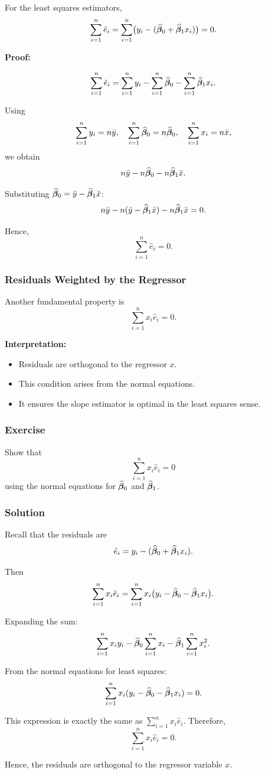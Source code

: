 For the least squares estimators,
\[
\sum_{i=1}^n \hat{e}_i
=
\sum_{i=1}^n \bigl(y_i - (\widehat{\boldsymbol{\beta}}_0 + \widehat{\boldsymbol{\beta}}_1 x_i)\bigr)
=
0.
\]

\textbf{Proof:}

\[
\sum_{i=1}^n \hat{e}_i
=
\sum_{i=1}^n y_i
-
\sum_{i=1}^n \widehat{\boldsymbol{\beta}}_0
-
\sum_{i=1}^n \widehat{\boldsymbol{\beta}}_1 x_i.
\]

Using
\[
\sum_{i=1}^n y_i = n\bar{y},
\quad
\sum_{i=1}^n \widehat{\boldsymbol{\beta}}_0 = n\widehat{\boldsymbol{\beta}}_0,
\quad
\sum_{i=1}^n x_i = n\bar{x},
\]
we obtain
\[
n\bar{y} - n\widehat{\boldsymbol{\beta}}_0 - n\widehat{\boldsymbol{\beta}}_1 \bar{x}.
\]

Substituting $\widehat{\boldsymbol{\beta}}_0 = \bar{y} - \widehat{\boldsymbol{\beta}}_1 \bar{x}$:
\[
n\bar{y} - n(\bar{y} - \widehat{\boldsymbol{\beta}}_1 \bar{x}) - n\widehat{\boldsymbol{\beta}}_1 \bar{x} = 0.
\]

Hence,
\[
\sum_{i=1}^n \hat{e}_i = 0.
\]

\subsubsection*{Residuals Weighted by the Regressor}

Another fundamental property is
\[
\sum_{i=1}^n x_i \hat{e}_i = 0.
\]

\textbf{Interpretation:}

\begin{itemize}
    \item Residuals are orthogonal to the regressor $x$.
    \item This condition arises from the normal equations.
    \item It ensures the slope estimator is optimal in the least squares sense.
\end{itemize}

\subsubsection*{Exercise}

Show that
\[
\sum_{i=1}^n x_i \hat{e}_i = 0
\]
using the normal equations for $\widehat{\boldsymbol{\beta}}_0$ and $\widehat{\boldsymbol{\beta}}_1$.

\subsubsection*{Solution}

Recall that the residuals are
\[
\hat{e}_i = y_i - (\widehat{\boldsymbol{\beta}}_0 + \widehat{\boldsymbol{\beta}}_1 x_i).
\]

Then
\[
\sum_{i=1}^n x_i \hat{e}_i
=
\sum_{i=1}^n x_i \bigl(y_i - \widehat{\boldsymbol{\beta}}_0 - \widehat{\boldsymbol{\beta}}_1 x_i\bigr).
\]

Expanding the sum:
\[
\sum_{i=1}^n x_i y_i
-
\widehat{\boldsymbol{\beta}}_0 \sum_{i=1}^n x_i
-
\widehat{\boldsymbol{\beta}}_1 \sum_{i=1}^n x_i^2.
\]

From the normal equations for least squares:
\[
\sum_{i=1}^n x_i (y_i - \widehat{\boldsymbol{\beta}}_0 - \widehat{\boldsymbol{\beta}}_1 x_i) = 0.
\]

This expression is exactly the same as $\sum_{i=1}^n x_i \hat{e}_i$. Therefore,
\[
\sum_{i=1}^n x_i \hat{e}_i = 0.
\]

Hence, the residuals are orthogonal to the regressor variable $x$.

\clearpage
